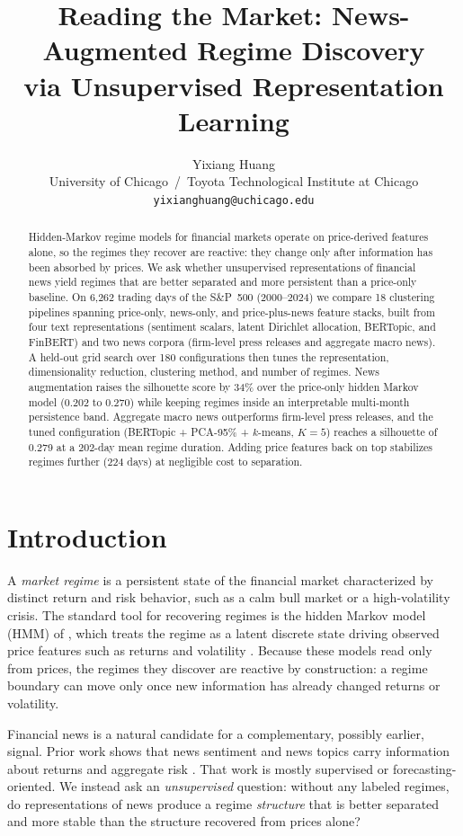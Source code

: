 \documentclass{article} %
\title{Reading the Market: News-Augmented Regime Discovery \\ via Unsupervised Representation Learning}
\author{Yixiang Huang \\
University of Chicago \,/\, Toyota Technological Institute at Chicago \\
\texttt{yixianghuang@uchicago.edu}}
\begin{document}
\maketitle

\begin{abstract}
Hidden-Markov regime models for financial markets operate on price-derived
features alone, so the regimes they recover are reactive: they change only
after information has been absorbed by prices. We ask whether unsupervised
representations of financial news yield regimes that are better separated and
more persistent than a price-only baseline. On 6{,}262 trading days of the
S\&P~500 (2000--2024) we compare 18 clustering pipelines spanning price-only,
news-only, and price-plus-news feature stacks, built from four text
representations (sentiment scalars, latent Dirichlet allocation, BERTopic, and
FinBERT) and two news corpora (firm-level press releases and aggregate macro
news). A held-out grid search over 180 configurations then tunes the
representation, dimensionality reduction, clustering method, and number of
regimes. News augmentation raises the silhouette score by 34\% over the
price-only hidden Markov model (0.202 to 0.270) while keeping regimes inside an
interpretable multi-month persistence band. Aggregate macro news outperforms
firm-level press releases, and the tuned configuration (BERTopic + PCA-95\% +
$k$-means, $K=5$) reaches a silhouette of 0.279 at a 202-day mean regime
duration. Adding price features back on top stabilizes regimes further
(224 days) at negligible cost to separation.
\end{abstract}

\section{Introduction}

A \emph{market regime} is a persistent state of the financial market
characterized by distinct return and risk behavior, such as a calm bull market
or a high-volatility crisis. The standard tool for recovering regimes is the
hidden Markov model (HMM) of \citet{hamilton1989}, which treats the regime as a
latent discrete state driving observed price features such as returns and
volatility \citep{ang2012}. Because these models read only from prices, the
regimes they discover are reactive by construction: a regime boundary can move
only once new information has already changed returns or volatility.

Financial news is a natural candidate for a complementary, possibly earlier,
signal. Prior work shows that news sentiment and news topics carry information
about returns and aggregate risk \citep{tetlock2007, glasserman2019,
bybee2024}. That work is mostly supervised or forecasting-oriented. We instead
ask an \emph{unsupervised} question: without any labeled regimes, do
representations of news produce a regime \emph{structure} that is better
separated and more stable than the structure recovered from prices alone?
\end{document}
